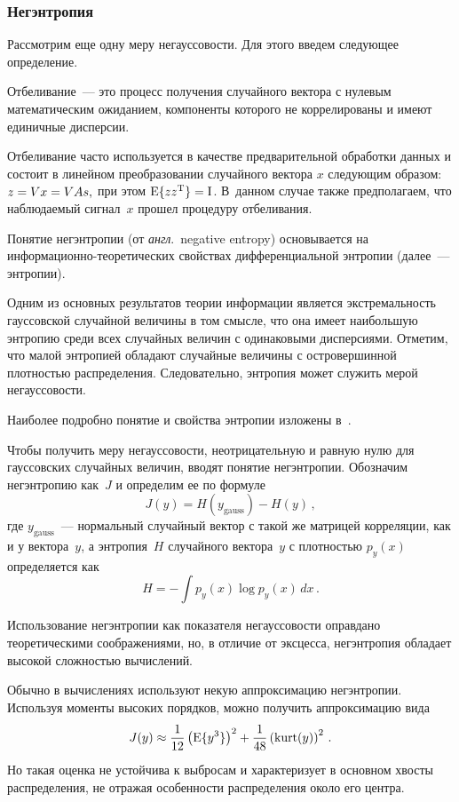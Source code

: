 \begin{multicols}{2}
\subsubsection {Негэнтропия}

Рассмотрим еще одну меру негауссовости. Для этого введем следующее
определение.

Отбеливание~--- это процесс получения случайного вектора с нулевым
математическим ожиданием, компоненты которого не коррелированы и
имеют единичные дисперсии.

Отбеливание часто используется в качестве предварительной обработки
данных и состоит в линейном преобразовании случайного вектора $x$
следующим образом: $z \hm= Vx \hm= VAs ,$ при этом $\mathrm{E}\lbrace
zz^{\mathrm{T}}\rbrace  \hm= \mathrm{I}$. В~данном случае также предполагаем,
что наблюдаемый сигнал~$x$ прошел процедуру отбеливания.

Понятие негэнтропии (от \textit{англ}.\  negative entropy) основывается
на ин\-фор\-ма\-ци\-он\-но-тео\-ре\-ти\-че\-ских свойствах дифференциальной энтропии
(далее~--- энтропии).

Одним из основных результатов теории информации является
экстремальность гауссовской случайной величины в том смысле, что она
имеет наибольшую энтропию среди всех случайных величин с одинаковыми
дисперсиями. Отметим, что малой энтропией обладают случайные
величины с островершинной плотностью распределения. Следовательно,
энтропия может служить мерой негаус\-со\-вости.

Наиболее подробно понятие и свойства энтропии изложены в~\cite{korolev}.

Чтобы получить меру негауссовости, неотрицательную и равную нулю для
гауссовских случайных величин, вводят понятие негэнтропии. Обозначим
негэнтропию как~$J$ и определим ее по формуле
$$
J(y) = H(y_{\mathrm{gauss}}) - H(y) \,,
$$
где $y_{\mathrm{gauss}}$~--- нормальный случайный вектор с такой же матрицей
корреляции, как и у вектора~$y$, а энтропия~$H$ случайного вектора~$y$
с плот\-ностью $p_y(x)$ определяется как
$$
H = - \int p_{y}(x)\log p_y(x)\,dx \,.
$$

Использование негэнтропии как показателя негауссовости оправдано
теоретическими соображениями, но, в отличие от эксцесса, негэнтропия
обладает высокой сложностью вычислений.

Обычно в вычислениях используют некую аппроксимацию негэнтропии.
Используя моменты высоких порядков, можно получить аппроксимацию вида
$$
J(y)\approx \displaystyle\frac{\displaystyle 1\mathstrut}{\displaystyle 12\mathstrut}\left(\mathrm{E} \{y^3\}\right)^2 +
\displaystyle\frac{\displaystyle 1\mathstrut}{\displaystyle 48\mathstrut} \left(\mathrm{kurt} (y)\right)^2 \,.
$$
Но такая оценка не устойчива к выбросам и характеризует в основном
хвосты распределения, не отражая особенности распределения около его центра.


\end{multicols}
